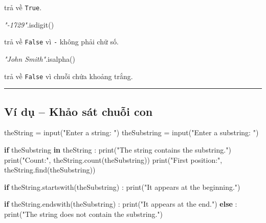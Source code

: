 \documentclass[
  11pt,
  a4paper,
]{article}
\newenvironment{Shaded}{}{}
\newcommand{\BuiltInTok}[1]{\textcolor[rgb]{0.00,0.50,0.00}{#1}}
\newcommand{\CommentTok}[1]{\textcolor[rgb]{0.38,0.63,0.69}{\textit{#1}}}
\newcommand{\ControlFlowTok}[1]{\textcolor[rgb]{0.00,0.44,0.13}{\textbf{#1}}}
\newcommand{\KeywordTok}[1]{\textcolor[rgb]{0.00,0.44,0.13}{\textbf{#1}}}
\newcommand{\NormalTok}[1]{#1}
\newcommand{\OperatorTok}[1]{\textcolor[rgb]{0.40,0.40,0.40}{#1}}
\newcommand{\StringTok}[1]{\textcolor[rgb]{0.25,0.44,0.63}{#1}}
\begin{document}
trả về \texttt{True}.

\begin{Shaded}
\begin{Highlighting}[]
\CommentTok{"{-}1729"}\NormalTok{.isdigit()}
\end{Highlighting}
\end{Shaded}

trả về \texttt{False} vì \texttt{-} không phải chữ số.

\begin{Shaded}
\begin{Highlighting}[]
\CommentTok{"John Smith"}\NormalTok{.isalpha()}
\end{Highlighting}
\end{Shaded}

trả về \texttt{False} vì chuỗi chứa khoảng trắng.

\begin{center}\rule{0.5\linewidth}{0.5pt}\end{center}

\subsection{Ví dụ -- Khảo sát chuỗi
con}\label{vuxed-dux1ee5-khux1ea3o-suxe1t-chuux1ed7i-con}

\begin{Shaded}
\begin{Highlighting}[]
\NormalTok{theString }\OperatorTok{=} \BuiltInTok{input}\NormalTok{(}\StringTok{"Enter a string: "}\NormalTok{)}
\NormalTok{theSubstring }\OperatorTok{=} \BuiltInTok{input}\NormalTok{(}\StringTok{"Enter a substring: "}\NormalTok{)}

\ControlFlowTok{if}\NormalTok{ theSubstring }\KeywordTok{in}\NormalTok{ theString :}
    \BuiltInTok{print}\NormalTok{(}\StringTok{"The string contains the substring."}\NormalTok{)}
    \BuiltInTok{print}\NormalTok{(}\StringTok{"Count:"}\NormalTok{, theString.count(theSubstring))}
    \BuiltInTok{print}\NormalTok{(}\StringTok{"First position:"}\NormalTok{, theString.find(theSubstring))}

    \ControlFlowTok{if}\NormalTok{ theString.startswith(theSubstring) :}
        \BuiltInTok{print}\NormalTok{(}\StringTok{"It appears at the beginning."}\NormalTok{)}

    \ControlFlowTok{if}\NormalTok{ theString.endswith(theSubstring) :}
        \BuiltInTok{print}\NormalTok{(}\StringTok{"It appears at the end."}\NormalTok{)}
\ControlFlowTok{else}\NormalTok{ :}
    \BuiltInTok{print}\NormalTok{(}\StringTok{"The string does not contain the substring."}\NormalTok{)}
\end{Highlighting}
\end{Shaded}
\end{document}
